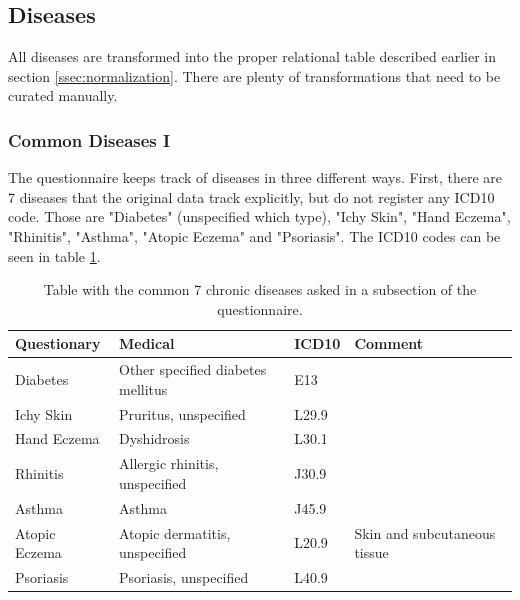 \subsection{Diseases}

All diseases are transformed into the proper relational table described earlier in section \ref{ssec:normalization}. There are plenty of transformations that need to be curated manually.

\subsubsection{Common Diseases I}

The questionnaire keeps track of diseases in three different ways. First, there are 7 diseases that the original data track explicitly, but do not register any ICD10 code. Those are "Diabetes" (unspecified which type), "Ichy Skin", "Hand Eczema", "Rhinitis", "Asthma", "Atopic Eczema" and "Psoriasis". The ICD10 codes can be seen in table \ref{table:Table_Common_Diseases}.

\begin{table}[H]

    \caption{Table with the common 7 chronic diseases asked in a subsection of the questionnaire.}

	\tiny

	\centering

    \label{table:Table_Common_Diseases}
    
	\renewcommand{\arraystretch}{1.5}

	\begin{tabular}{|llll|}
		\hline
		\rowcolor[HTML]{FFAAAA} 
		Questionary   & Medical                        & ICD10 & Comment                                         \\ \hline
		
		Diabetes      & Other specified diabetes mellitus & E13   &  \\
		Ichy Skin     & Pruritus, unspecified          & L29.9 &                                                 \\
		Hand Eczema   & Dyshidrosis                    & L30.1 &                                                \\
		Rhinitis      & Allergic rhinitis, unspecified & J30.9 &                   \\
		
		Asthma        & Asthma                         & J45.9 &                                                 \\
		Atopic Eczema & Atopic dermatitis, unspecified & L20.9 & Skin and subcutaneous tissue                    \\
		Psoriasis     & Psoriasis, unspecified         & L40.9 &  \\ \hline
		
	\end{tabular}
	
\end{table}

